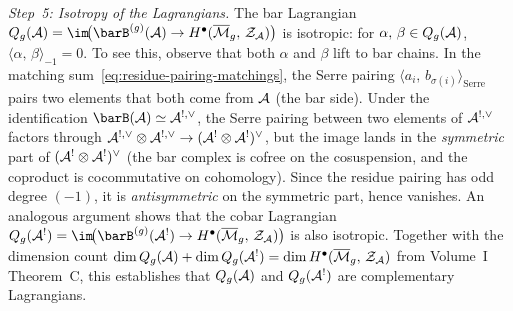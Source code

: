 \begin{construction}
\medskip
\noindent
\textit{Step~5: Isotropy of the Lagrangians.}\enspace
The bar Lagrangian
$Q_g(\cA) = \im\!\bigl(\barB^{(g)}(\cA)
\to H^\bullet(\Mbar_g,\,\cZ_\cA)\bigr)$
is isotropic: for $\alpha,\,\beta \in Q_g(\mathcal{A})$,
$\langle\alpha,\,\beta\rangle_{-1} = 0$. To see this, observe
that both $\alpha$ and $\beta$ lift to bar chains. In the
matching sum~\eqref{eq:residue-pairing-matchings}, the Serre
pairing $\langle a_i,\, b_{\sigma(i)}\rangle_{\mathrm{Serre}}$
pairs two elements that both come from $\mathcal{A}$ (the bar side).
Under the identification $\barB(\cA) \simeq \cA^{!,\vee}$, the
Serre pairing between two elements of $\mathcal{A}^{!,\vee}$ factors
through
$\mathcal{A}^{!,\vee} \otimes \mathcal{A}^{!,\vee} \to (\mathcal{A}^! \otimes \mathcal{A}^!)^\vee$,
but the image lands in the \emph{symmetric} part of
$(\mathcal{A}^! \otimes \mathcal{A}^!)^\vee$ (the bar complex is cofree on the
cosuspension, and the coproduct is cocommutative on cohomology).
Since the residue pairing has odd degree $(-1)$, it is
\emph{antisymmetric} on the symmetric part, hence vanishes. An
analogous argument shows that the cobar Lagrangian
$Q_g(\cA^!) = \im\!\bigl(\barB^{(g)}(\cA^!)
\to H^\bullet(\Mbar_g,\,\cZ_\cA)\bigr)$
is also isotropic. Together with the dimension count
$\dim Q_g(\mathcal{A}) + \dim Q_g(\mathcal{A}^!)
= \dim H^\bullet(\overline{\mathcal{M}}_g,\,\mathcal{Z}_{\mathcal{A}})$
from Volume~I Theorem~C, this establishes that $Q_g(\mathcal{A})$ and
$Q_g(\mathcal{A}^!)$ are complementary Lagrangians.
\end{construction}

